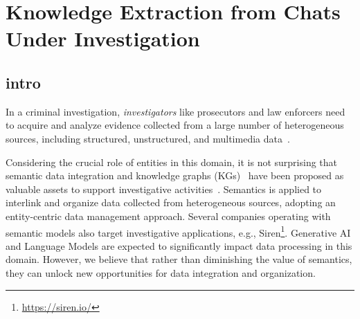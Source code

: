 \section{Knowledge Extraction from Chats Under Investigation}



\subsection{intro}


In a criminal investigation, \textit{investigators} like prosecutors and law enforcers %
need to acquire and analyze evidence collected from a large number of heterogeneous sources, including structured, unstructured, and multimedia data~\cite{real_batini2021semantic}.

Considering the crucial role of entities in this domain, it is not surprising that semantic data integration and knowledge graphs (KGs)~\cite{knoblock2015exploiting} have been proposed as valuable assets to support investigative activities~\cite{szekely2015building,real_batini2021semantic}. Semantics is applied to interlink and organize data collected from heterogeneous sources, adopting an entity-centric data management approach.
Several companies operating with semantic models also target investigative applications, e.g., Siren\footnote{\url{https://siren.io/}}. Generative AI and Language Models are expected to significantly impact data processing in this domain. However, we believe that rather than diminishing the value of semantics, they can unlock new opportunities for data integration and organization. 


